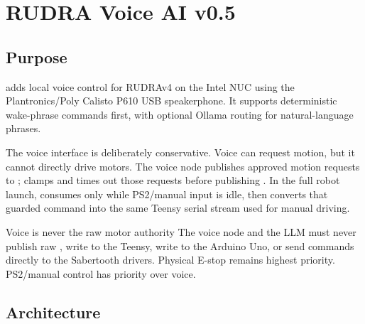 \chapter{RUDRA Voice AI v0.5}

\section{Purpose}

 adds local voice control for RUDRAv4 on the Intel NUC using the Plantronics/Poly Calisto P610 USB speakerphone. It supports deterministic wake-phrase commands first, with optional Ollama routing for natural-language phrases.

The voice interface is deliberately conservative. Voice can request motion, but it cannot directly drive motors. The voice node publishes approved motion requests to ;  clamps and times out those requests before publishing . In the full robot launch,  consumes  only while PS2/manual input is idle, then converts that guarded command into the same Teensy serial stream used for manual driving.

\begin{safetybox}{Voice is never the raw motor authority}
The voice node and the LLM must never publish raw , write to the Teensy, write to the Arduino Uno, or send commands directly to the Sabertooth drivers. Physical E-stop remains highest priority. PS2/manual control has priority over voice.
\end{safetybox}

\section{Architecture}

